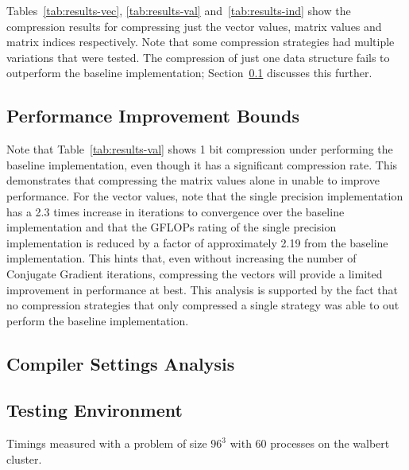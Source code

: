 
Tables~\ref{tab:results-vec}, \ref{tab:results-val} and~\ref{tab:results-ind} show the compression results for compressing just the vector values, matrix values and matrix indices respectively.
Note that some compression strategies had multiple variations that were tested.
The compression of just one data structure fails to outperform the baseline implementation; Section~\ref{sec:results-bounds} discusses this further.






\subsection{Performance Improvement Bounds}
\label{sec:results-bounds}
Note that Table~\ref{tab:results-val} shows 1 bit compression under performing the baseline implementation, even though it has a significant compression rate.
This demonstrates that compressing the matrix values alone in unable to improve performance.
For the vector values, note that the single precision implementation has a 2.3 times increase in iterations to convergence over the baseline implementation and that the GFLOPs rating of the single precision implementation is reduced by a factor of approximately 2.19 from the baseline implementation.
This hints that, even without increasing the number of Conjugate Gradient iterations, compressing the vectors will provide a limited improvement in performance at best.
This analysis is supported by the fact that no compression strategies that only compressed a single strategy was able to out perform the baseline implementation.

\subsection{Compiler Settings Analysis}

\subsection{Testing Environment}
Timings measured with a problem of size \(96^3\) with 60 processes on the walbert cluster.